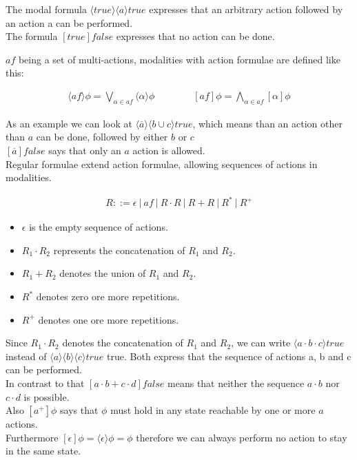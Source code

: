 \documentclass{clseminar}
\begin{document}
  The modal formula $\langle true \rangle \langle a \rangle true$ expresses that an arbitrary action followed by an action a can be performed. \\
  The formula $[true]false$ expresses that no action can be done.

  $\mathit{af}$ being a set of multi-actions, modalities with action formulae are defined like this:

  \begin{align*}
    \langle{\mathit{af}}\rangle\phi = \bigvee_{\alpha \in \mathit{af}} \langle\alpha\rangle\phi
    \qquad\qquad
    [\mathit{af}]\phi = \bigwedge_{\alpha \in \mathit{af}} [\alpha]\phi
  \end{align*}

  As an example we can look at $\langle\overline{a}\rangle\langle{b \cup c}\rangle\mathit{true}$, which means than an action other than $a$ can be done, followed by either $b$ or $c$ \\
  $[\overline{a}]\mathit{false}$ says that only an $a$ action is allowed. \\

  Regular formulae extend action formulae, allowing sequences of actions in modalities.

  \begin{align*}
    R ::= \epsilon\ |\ \mathit{af}\ |\ R\cdot{R}\ |\ R+R\ |\ R^*\ |\ R^+
  \end{align*}

  \begin{itemize}
    \item $\epsilon$ is the empty sequence of actions.
    \item $R_1\cdot{R_2}$ represents the concatenation of $R_1$ and $R_2$.
    \item $R_1+R_2$ denotes the union of  $R_1$ and $R_2$.
    \item $R^*$ denotes zero ore more repetitions.
    \item $R^+$ denotes one ore more repetitions.
  \end{itemize}

  Since $R_1\cdot{R_2}$ denotes the concatenation of $R_1$ and $R_2$, we can write $\langle a \cdot b \cdot c \rangle true$ instead of $\langle a \rangle \langle b \rangle \langle c \rangle true$ true. Both express that the sequence of actions a, b and c can be performed. \\
  In contrast to that $[a\cdot{b} + c\cdot{d}]\mathit{false}$ means that neither the sequence $a\cdot{b}$ nor $c\cdot{d}$ is possible. \\
  Also $[a^+]\phi$ says that $\phi$ must hold in any state reachable by one or more $a$ actions. \\
  Furthermore $[\epsilon]\phi = \langle \epsilon \rangle \phi = \phi$ therefore we can always perform no action to stay in the same state. \\
\end{document}
